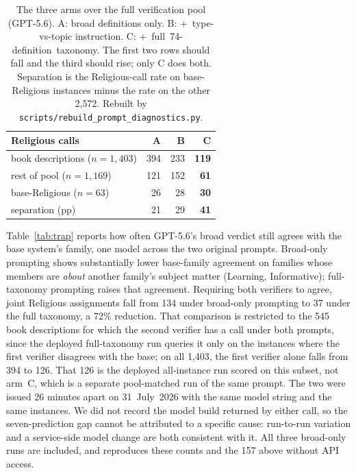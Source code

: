\documentclass[11pt]{article}
\begin{document}
\begin{table}[h]
\centering\small
\begin{tabular}{lrrr}
\toprule
Religious calls & A & B & C \\
\midrule
book descriptions ($n{=}1{,}403$)  & 394 & 233 & \textbf{119} \\
rest of pool ($n{=}1{,}169$)       & 121 & 152 & \textbf{61} \\
base-Religious ($n{=}63$)          & 26 & 28 & \textbf{30} \\
\midrule
separation (pp)                    & 21 & 29 & \textbf{41} \\
\bottomrule
\end{tabular}
\caption{The three arms over the full verification pool (GPT-5.6). A: broad definitions only.
B: \mbox{+ type-vs-topic} instruction. C: \mbox{+ full 74-definition taxonomy}. The first two rows
should fall and the third should rise; only C does both. Separation is the Religious-call rate on
base-Religious instances minus the rate on the other 2{,}572. Rebuilt by
\texttt{scripts/rebuild\_\allowbreak prompt\_\allowbreak diagnostics.py}.}
\label{tab:arms}
\end{table}

Table~\ref{tab:trap} reports how often GPT-5.6's broad verdict still agrees with the base
system's family, one model across the two original prompts. Broad-only prompting shows substantially lower base-family
agreement on families whose members are \emph{about} another family's subject matter (Learning,
Informative); full-taxonomy prompting raises that agreement. Requiring both
verifiers to agree, joint Religious assignments fall from 134 under broad-only prompting to 37
under the full taxonomy, a 72\% reduction. That comparison is restricted to the 545 book
descriptions for which the second verifier has a call under both prompts, since the deployed
full-taxonomy run queries it only on the instances where the first verifier disagrees with the
base; on all 1{,}403, the first verifier alone falls from 394 to 126. That 126 is the deployed
all-instance run scored on this subset, not arm~C, which is a separate pool-matched run of the
same prompt. The two were issued 26 minutes apart on 31~July~2026 with the same model string and
the same instances. We did not record the model build returned by either call, so the
seven-prediction gap cannot be attributed to a specific cause: run-to-run variation and a
service-side model change are both consistent with it.
All three broad-only runs are included, and
 reproduces these counts and the 157 above
without API access.
\end{document}
